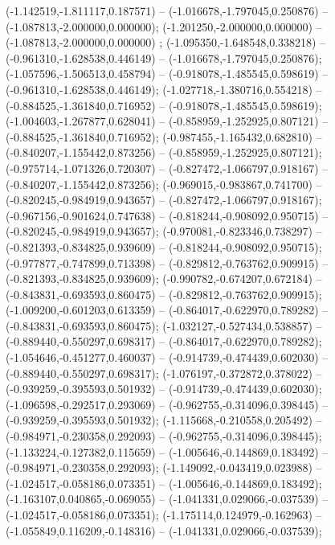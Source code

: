  (-1.142519,-1.811117,0.187571) -- (-1.016678,-1.797045,0.250876) -- (-1.087813,-2.000000,0.000000);
 (-1.201250,-2.000000,0.000000) -- (-1.087813,-2.000000,0.000000) ;
 (-1.095350,-1.648548,0.338218) -- (-0.961310,-1.628538,0.446149) -- (-1.016678,-1.797045,0.250876);
 (-1.057596,-1.506513,0.458794) -- (-0.918078,-1.485545,0.598619) -- (-0.961310,-1.628538,0.446149);
 (-1.027718,-1.380716,0.554218) -- (-0.884525,-1.361840,0.716952) -- (-0.918078,-1.485545,0.598619);
 (-1.004603,-1.267877,0.628041) -- (-0.858959,-1.252925,0.807121) -- (-0.884525,-1.361840,0.716952);
 (-0.987455,-1.165432,0.682810) -- (-0.840207,-1.155442,0.873256) -- (-0.858959,-1.252925,0.807121);
 (-0.975714,-1.071326,0.720307) -- (-0.827472,-1.066797,0.918167) -- (-0.840207,-1.155442,0.873256);
 (-0.969015,-0.983867,0.741700) -- (-0.820245,-0.984919,0.943657) -- (-0.827472,-1.066797,0.918167);
 (-0.967156,-0.901624,0.747638) -- (-0.818244,-0.908092,0.950715) -- (-0.820245,-0.984919,0.943657);
 (-0.970081,-0.823346,0.738297) -- (-0.821393,-0.834825,0.939609) -- (-0.818244,-0.908092,0.950715);
 (-0.977877,-0.747899,0.713398) -- (-0.829812,-0.763762,0.909915) -- (-0.821393,-0.834825,0.939609);
 (-0.990782,-0.674207,0.672184) -- (-0.843831,-0.693593,0.860475) -- (-0.829812,-0.763762,0.909915);
 (-1.009200,-0.601203,0.613359) -- (-0.864017,-0.622970,0.789282) -- (-0.843831,-0.693593,0.860475);
 (-1.032127,-0.527434,0.538857) -- (-0.889440,-0.550297,0.698317) -- (-0.864017,-0.622970,0.789282);
 (-1.054646,-0.451277,0.460037) -- (-0.914739,-0.474439,0.602030) -- (-0.889440,-0.550297,0.698317);
 (-1.076197,-0.372872,0.378022) -- (-0.939259,-0.395593,0.501932) -- (-0.914739,-0.474439,0.602030);
 (-1.096598,-0.292517,0.293069) -- (-0.962755,-0.314096,0.398445) -- (-0.939259,-0.395593,0.501932);
 (-1.115668,-0.210558,0.205492) -- (-0.984971,-0.230358,0.292093) -- (-0.962755,-0.314096,0.398445);
 (-1.133224,-0.127382,0.115659) -- (-1.005646,-0.144869,0.183492) -- (-0.984971,-0.230358,0.292093);
 (-1.149092,-0.043419,0.023988) -- (-1.024517,-0.058186,0.073351) -- (-1.005646,-0.144869,0.183492);
 (-1.163107,0.040865,-0.069055) -- (-1.041331,0.029066,-0.037539) -- (-1.024517,-0.058186,0.073351);
 (-1.175114,0.124979,-0.162963) -- (-1.055849,0.116209,-0.148316) -- (-1.041331,0.029066,-0.037539);
